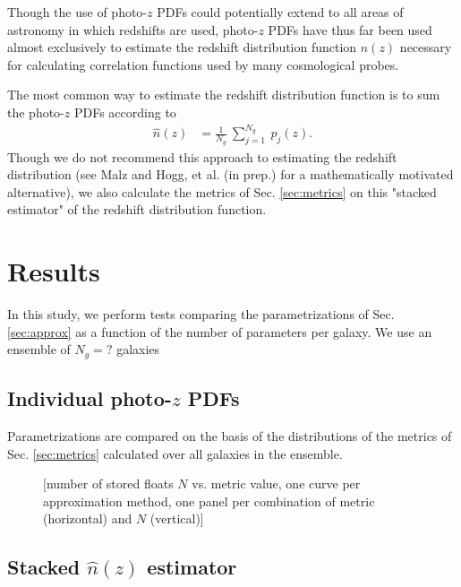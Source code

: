 \documentclass[\docopts]{\docclass}
\begin{document}
Though the use of photo-$z$ PDFs could potentially extend to all areas of 
astronomy in which redshifts are used, photo-$z$ PDFs have thus far been used 
almost exclusively to estimate the redshift distribution function $n(z)$ 
necessary for calculating correlation functions used by many cosmological 
probes.


The most common way to estimate the redshift distribution function is to sum 
the photo-$z$ PDFs according to
\begin{align}
  \label{eq:nz}
  \hat{n}(z) &= \frac{1}{N_{g}}\ \sum_{j=1}^{N_{g}}\ p_{j}(z).
\end{align}
Though we do not recommend this approach to estimating the redshift 
distribution (see Malz and Hogg, et al. (in prep.) for a mathematically 
motivated alternative), we also calculate the metrics of Sec. \ref{sec:metrics} 
on this "stacked estimator" of the redshift distribution function.






\section{Results}
\label{sec:results}



In this study, we perform tests comparing the parametrizations of Sec. 
\ref{sec:approx} as a function of the number of parameters per galaxy.  We use 
an ensemble of $N_{g}=?$ galaxies

\subsection{Individual photo-$z$ PDFs}
\label{sec:individual}

Parametrizations are compared on the basis of the distributions of the metrics 
of Sec. \ref{sec:metrics} calculated over all galaxies in the ensemble.

\begin{figure}
  \caption{[number of stored floats $N$ vs. metric value, one curve per 
approximation method, one panel per combination of metric (horizontal) and $N$ 
(vertical)]
  \label{fig:individual}}
\end{figure}

\subsection{Stacked $\hat{n}(z)$ estimator}
\label{sec:stacked}
\end{document}
